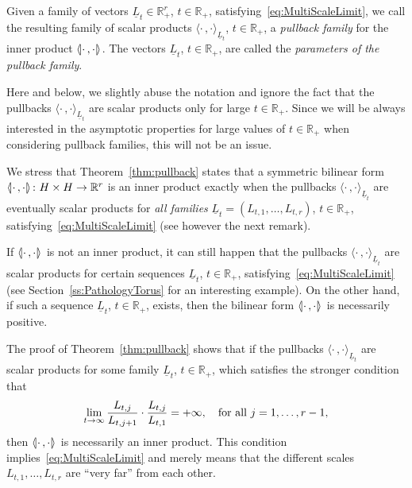 \documentclass[AHL,Unicode,longabstracts]{cedram}
\newcommand{\innone}[2]{{\langle#2\rangle_{#1}}}
\newcommand{\llangle}{\mathopen{\langle\mkern -3.1mu\lvert}}
\newcommand{\rrangle}{\mathclose{\rvert\mkern -3.1mu\rangle}}
\newcommand{\highinn}[2]{{\llangle#2\rrangle_{#1}}}
\newcommand{\R}{\mathbb{R}}
\renewcommand*{\to}{\mathchoice{\longrightarrow}{\rightarrow}{\rightarrow}{\rightarrow}}
\begin{document}
Given a family of vectors $\underline L_t \in \R_+^r$, $t \in \R_+$, satisfying~\eqref{eq:MultiScaleLimit}, we call the resulting family of scalar products $\innone{\underline L_t}{\cdot\,, \cdot}$, $t \in \R_+$, a \emph{pullback family} for the inner product $\highinn{}{\cdot\,, \cdot}$. The vectors $\underline L_t$, $t \in \R_+$, are called the \emph{parameters of the pullback family}.

Here and below, we slightly abuse the notation and ignore the fact that the pullbacks $\innone{\underline L_t}{\cdot\,, \cdot}$ are scalar products only for large $t \in \R_+$. Since we will be always interested in the asymptotic properties for large values of $t \in \R_+$ when considering pullback families, this will not be an issue.


\begin{rema}
We stress that Theorem~\ref{thm:pullback} states that a symmetric bilinear form $\highinn{}{\cdot\,, \cdot} \colon H \times H\to \R^r$ is an inner product exactly when the pullbacks $\innone{\underline L_t}{\cdot\,, \cdot}$ are eventually scalar products for \emph{all families} $\underline L_t = (L_{t,1}, \dots, L_{t,r})$, $t \in \R_+$, satisfying~\eqref{eq:MultiScaleLimit} (see however the next remark).

If $\highinn{}{\cdot\,, \cdot}$ is not an inner product, it can still happen that the pullbacks $\innone{\underline L_t}{\cdot\,, \cdot}$ are scalar products for certain sequences $\underline L_t$, $t \in \R_+$, satisfying~\eqref{eq:MultiScaleLimit} (see Section~\ref{ss:PathologyTorus} for an interesting example). On the other hand, if such a sequence $\underline L_t$, $t \in \R_+$, exists, then the bilinear form $\highinn{}{\cdot\,, \cdot}$ is necessarily positive.%
\end{rema}

\begin{rema}
The proof of Theorem~\ref{thm:pullback} shows that if the pullbacks $\innone{\underline L_t}{\cdot\,,\cdot}$ are scalar products for some family $\underline L_t$, $t \in \R_+$, which satisfies the stronger condition that
\begin{equation}\label{eq:StrongSeparation}
\lim_{t \to \infty} \frac{L_{t,j}}{L_{t, j+1}} \cdot \frac{L_{t,j}}{L_{t,1}} = + \infty, \quad \text{for all }j=1, \dots, r-1,
\end{equation}
then $\highinn{}{\cdot\,, \cdot}$ is necessarily an inner product. This condition implies~\eqref{eq:MultiScaleLimit} and merely means that the different scales $L_{t,1}, \dots,L_{t,r}$ are ``very far'' from each other.%
\end{rema}
\end{document}
